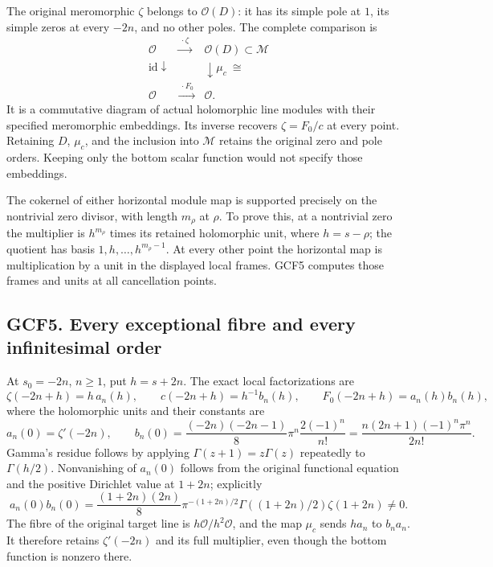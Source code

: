 The original meromorphic \(\zeta\) belongs to \(\mathcal O(D)\): it has
its simple pole at \(1\), its simple zeros at every \(-2n\), and no
other poles. The complete comparison is \[
\begin{array}{ccc}
\mathcal O&\xrightarrow{\ \cdot\zeta\ }&\mathcal O(D)\subset\mathcal M\\
\mathrm{id}\downarrow&&\downarrow\mu_c\ \cong\\
\mathcal O&\xrightarrow{\ \cdot F_0\ }&\mathcal O.
\end{array}
\tag{GCF4.3}
\] It is a commutative diagram of actual holomorphic line modules with
their specified meromorphic embeddings. Its inverse recovers
\(\zeta=F_0/c\) at every point. Retaining \(D\), \(\mu_c\), and the
inclusion into \(\mathcal M\) retains the original zero and pole orders.
Keeping only the bottom scalar function would not specify those
embeddings.

The cokernel of either horizontal module map is supported precisely on
the nontrivial zero divisor, with length \(m_\rho\) at \(\rho\). To
prove this, at a nontrivial zero the multiplier is \(h^{m_\rho}\) times
its retained holomorphic unit, where \(h=s-\rho\); the quotient has
basis \(1,h,\ldots,h^{m_\rho-1}\). At every other point the horizontal
map is multiplication by a unit in the displayed local frames. GCF5
computes those frames and units at all cancellation points.

\subsection{GCF5. Every exceptional fibre and every infinitesimal
order}\label{gcf5.-every-exceptional-fibre-and-every-infinitesimal-order}

At \(s_0=-2n\), \(n\ge1\), put \(h=s+2n\). The exact local
factorizations are \[
\zeta(-2n+h)=h\,a_n(h),\qquad
c(-2n+h)=h^{-1}b_n(h),\qquad
F_0(-2n+h)=a_n(h)b_n(h),
\tag{GCF5.1}
\] where the holomorphic units and their constants are \[
a_n(0)=\zeta'(-2n),\qquad
b_n(0)=\frac{(-2n)(-2n-1)}8\pi^n\frac{2(-1)^n}{n!}
=\frac{n(2n+1)(-1)^n\pi^n}{2n!}.
\tag{GCF5.2}
\] Gamma's residue follows by applying \(\Gamma(z+1)=z\Gamma(z)\)
repeatedly to \(\Gamma(h/2)\). Nonvanishing of \(a_n(0)\) follows from
the original functional equation and the positive Dirichlet value at
\(1+2n\); explicitly \[
a_n(0)b_n(0)=
\frac{(1+2n)(2n)}8\pi^{-(1+2n)/2}
\Gamma((1+2n)/2)\zeta(1+2n)\ne0.
\tag{GCF5.3}
\] The fibre of the original target line is
\(h\mathcal O/h^2\mathcal O\), and the map \(\mu_c\) sends \(h a_n\) to
\(b_na_n\). It therefore retains \(\zeta'(-2n)\) and its full
multiplier, even though the bottom function is nonzero there.

